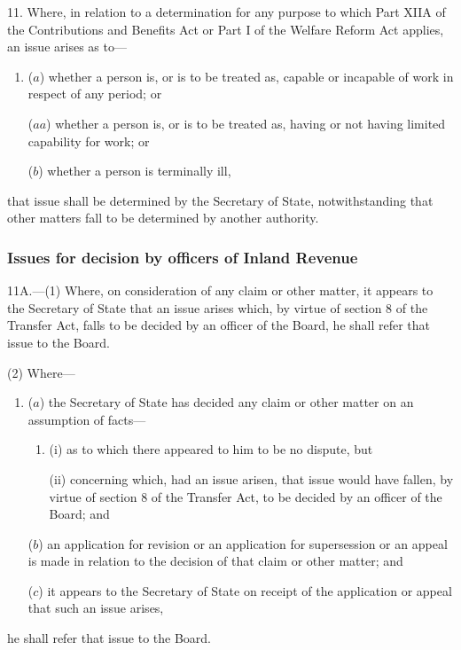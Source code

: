 \documentclass[12pt,a4paper]{article}
\begin{document}
11.  Where, in relation to a determination for any purpose to which Part XIIA of the Contributions and Benefits Act 
or Part I of the Welfare Reform Act  %
applies, an issue arises as to—
\begin{enumerate}\item[]
($a$) whether a person is, or is to be treated as, capable or incapable of work in respect of any period; or

($aa$) whether a person is, or is to be treated as, having or not having limited capability for work; or

($b$) whether a person is terminally ill,
\end{enumerate}
that issue shall be determined by the Secretary of State, notwithstanding that other matters fall to be determined by another authority.


\subsubsection[11A. Issues for decision by officers of Inland Revenue]{Issues for decision by officers of Inland Revenue}

11A.---(1)  Where, on consideration of any claim or other matter, it appears to the Secretary of State that an issue arises which, by virtue of section 8 of the Transfer Act, falls to be decided by an officer of the Board, he shall refer that issue to the Board.

(2) Where—
\begin{enumerate}\item[]
($a$) the Secretary of State has decided any claim or other matter on an assumption of facts—
\begin{enumerate}\item[]
(i) as to which there appeared to him to be no dispute, but

(ii) concerning which, had an issue arisen, that issue would have fallen, by virtue of section 8 of the Transfer Act, to be decided by an officer of the Board; and
\end{enumerate}

($b$) an application for revision or an application for supersession 
or an appeal  %
is made in relation to the decision of that claim or other matter; and

($c$) it appears to the Secretary of State on 
receipt of the application or appeal  %
that such an issue arises,
\end{enumerate}
he shall refer that issue to the Board.
\end{document}
